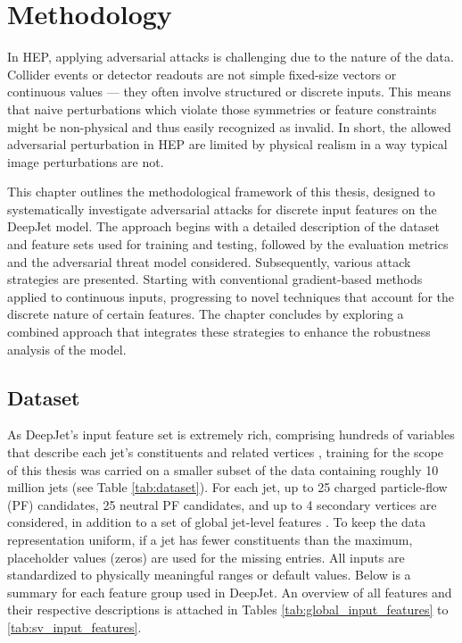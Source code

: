 
\chapter{Methodology}

In HEP, applying adversarial attacks is challenging due to the nature of the data. Collider events or detector readouts are not simple fixed-size vectors or continuous values — they often involve structured or discrete inputs. This means that naive perturbations which violate those symmetries or feature constraints might be non-physical and thus easily recognized as invalid. In short, the allowed adversarial perturbation in HEP are limited by physical realism in a way typical image perturbations are not.

This chapter outlines the methodological framework of this thesis, designed to systematically investigate adversarial attacks for discrete input features on the DeepJet model. The approach begins with a detailed description of the dataset and feature sets used for training and testing, followed by the evaluation metrics and the adversarial threat model considered. Subsequently, various attack strategies are presented. Starting with conventional gradient-based methods applied to continuous inputs, progressing to novel techniques that account for the discrete nature of certain features. The chapter concludes by exploring a combined approach that integrates these strategies to enhance the robustness analysis of the model.


\section{Dataset}
\label{sec:dataset}

As DeepJet’s input feature set is extremely rich, comprising hundreds of variables that describe each jet’s constituents and related vertices \cite{Bols_2020}, training for the scope of this thesis was carried on a smaller subset of the data containing roughly 10 million jets (see Table \ref{tab:dataset}). For each jet, up to 25 charged particle-flow (PF) candidates, 25 neutral PF candidates, and up to 4 secondary vertices are considered, in addition to a set of global jet-level features \cite{Bols_2020}. To keep the data representation uniform, if a jet has fewer constituents than the maximum, placeholder values (zeros) are used for the missing entries. All inputs are standardized to physically meaningful ranges or default values. Below is a
summary for each feature group used in DeepJet. An overview of all features and their respective descriptions is attached in Tables \ref{tab:global_input_features} to \ref{tab:sv_input_features}.



